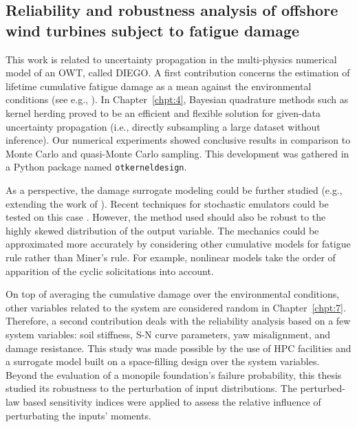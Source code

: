\subsection*{Reliability and robustness analysis of offshore wind turbines subject to fatigue damage}

This work is related to uncertainty propagation in the multi-physics numerical model of an OWT, called DIEGO. 
A first contribution concerns the estimation of lifetime cumulative fatigue damage as a mean against the environmental conditions (see e.g., \citealp{muller_cheng_2018}). 
In Chapter~\ref{chpt:4}, Bayesian quadrature methods such as kernel herding \citep{chen_welling_2010,husar_duvenaud_2012} proved to be an efficient and flexible solution for given-data uncertainty propagation (i.e., directly subsampling a large dataset without inference). 
Our numerical experiments showed conclusive results in comparison to Monte Carlo and quasi-Monte Carlo sampling. 
This development was gathered in a Python package named \texttt{otkerneldesign}. 

As a perspective, the damage surrogate modeling could be further studied (e.g., extending the work of \citealp{slot_sorensen_2020}). 
Recent techniques for stochastic emulators could be tested on this case \citep{baker_2022_stochastic_surrogates_review,zhu_2023_stochastic_pce,luthen_2023_stochastic_pce}.
However, the method used should also be robust to the highly skewed distribution of the output variable. 
The mechanics could be approximated more accurately by considering other cumulative models for fatigue rule rather than Miner's rule. 
For example, nonlinear models \citep{rocher_2020_nonlinear_fatigue} take the order of apparition of the cyclic solicitations into account.  

On top of averaging the cumulative damage over the environmental conditions, other variables related to the system are considered random in Chapter~\ref{chpt:7}. 
Therefore, a second contribution deals with the reliability analysis based on a few system variables: soil stiffness, S-N curve parameters, yaw misalignment, and damage resistance.   
This study was made possible by the use of HPC facilities and a surrogate model built on a space-filling design over the system variables. 
Beyond the evaluation of a monopile foundation's failure probability, this thesis studied its robustness to the perturbation of input distributions.  
The perturbed-law based sensitivity indices \citep{lemaitre_2015_PLI} were applied to assess the relative influence of perturbating the inputs' moments. 

